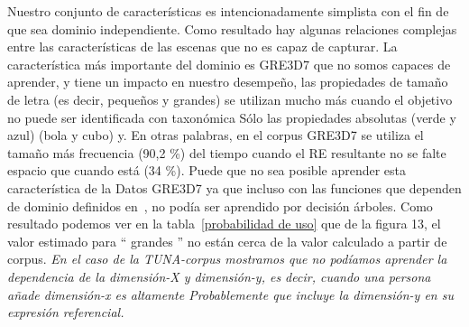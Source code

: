 

Nuestro conjunto de caracter\'{i}sticas es intencionadamente simplista con el fin de que sea
dominio independiente. Como resultado hay algunas relaciones complejas
entre las caracter\'{i}sticas de las escenas que no es capaz de
capturar. La caracter\'{i}stica m\'as importante del dominio es GRE3D7
que no somos capaces de aprender, y tiene un impacto en nuestro desempe\~no,
las propiedades de tama\~no de letra (es decir, peque\~nos y grandes) se utilizan mucho
m\'as cuando el objetivo no puede ser identificada con taxon\'omica
S\'olo las propiedades absolutas (verde y azul) (bola y cubo) y. En
otras palabras, en el corpus GRE3D7 se utiliza el tama\~no m\'as frecuencia (90,2 \%)
del tiempo cuando el RE resultante no se falte espacio que cuando est\'a
(34 \%). Puede que no sea posible aprender esta caracter\'{i}stica de la
Datos GRE3D7 ya que incluso con las funciones que dependen de dominio definidos
en~\cite[Cap\'{i}tulo 6] {viet:gene11}, no pod\'{i}a ser aprendido por decisi\'on
\'arboles. Como resultado podemos ver en la tabla~\ref{probabilidad de uso} que
de la figura 13, el valor estimado para `` grandes '' no est\'an cerca de la
valor calculado a partir de corpus. \textit{En el caso de la TUNA-corpus
  mostramos que no pod\'{i}amos aprender la dependencia de la dimensi\'on-X y
  dimensi\'on-y, es decir, cuando una persona a\~nade dimensi\'on-x es altamente
  Probablemente que incluye la dimensi\'on-y en su expresi\'on referencial.}

